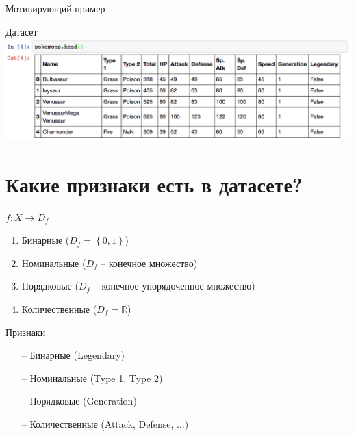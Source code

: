\documentclass[10pt]{beamer}
\begin{document}
{\begin{frame}{Мотивирующий пример}
\begin{figure}
	    \qquad
	    \qquad
	\end{figure}
\end{frame}
}

\begin{frame}{Датасет}
    \centering
	\includegraphics[width=\textwidth]{images/pokemons}
\end{frame}

\section{Какие признаки есть в датасете?}

\begin{frame}
	${f: X \rightarrow D_f}$
	\begin{enumerate} [-]
	  \item Бинарные (${D_f = \left\{ 0, 1 \right\} }$)
	  \item Номинальные (${D_f}$ -- конечное множество)
	  \item Порядковые (${D_f}$ -- конечное упорядоченное множество)
	  \item Количественные (${D_f = \mathbb{R} }$)
	\end{enumerate}
\end{frame}

\begin{frame}{Признаки}
	\begin{enumerate} [<+->]	
		\item[--] Бинарные (Legendary)
		\item[--] Номинальные (Type 1, Type 2)
		\item[--] Порядковые (Generation)
		\item[--] Количественные (Attack, Defense, ...)
	\end{enumerate}
\end{frame}
\end{document}
